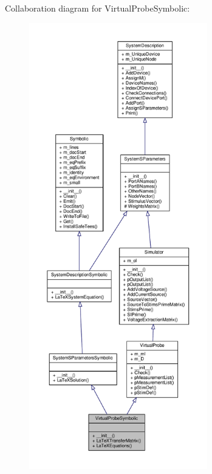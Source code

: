 Collaboration diagram for Virtual\+Probe\+Symbolic\+:\nopagebreak
\begin{figure}[H]
\begin{center}
\leavevmode
\includegraphics[height=550pt]{classSignalIntegrity_1_1SystemDescriptions_1_1VirtualProbeSymbolic_1_1VirtualProbeSymbolic__coll__graph}
\end{center}
\end{figure}
